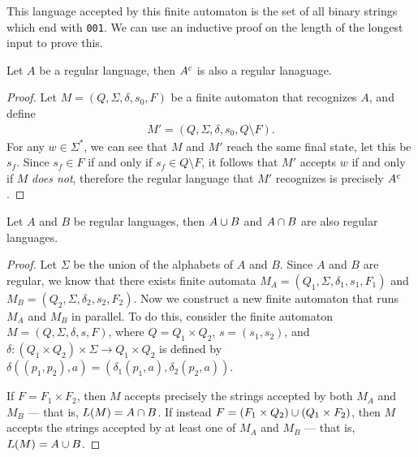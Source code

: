 \begin{exmp}
    This language accepted by this finite automaton is the set of all binary strings which end with \texttt{001}. We can use an inductive proof on the length of the longest input to prove this.
\end{exmp}

\begin{prop}\label{regular-language-complement}
    Let $A$ be a regular language, then $A^{c}$ is also a regular lanaguage.
\end{prop}

\begin{proof}
    Let $M = (Q, \Sigma, \delta, s_0, F)$ be a finite automaton that recognizes $A$, and define
    \begin{align*}
        M' = (Q, \Sigma, \delta, s_0, Q \setminus F).
    \end{align*}
    For any $w \in \Sigma^{*}$, we can see that $M$ and $M'$ reach the same final state, let this be $s_f$. Since $s_f \in F$ if and only if $s_f \in Q \setminus F$, it follows that $M'$ accepts $w$ if and only if $M$ \emph{does not}, therefore the regular language that $M'$ recognizes is precisely $A^{c}$.
\end{proof}

\begin{thm}\label{regular-language-union-intersection}
    Let $A$ and $B$ be regular languages, then $A \cup B$ and $A \cap B$ are also regular languages.
\end{thm}

\begin{proof}
    Let $\Sigma$ be the union of the alphabets of $A$ and $B$. Since $A$ and $B$ are regular, we know that there exists finite automata $M_A = \left(Q_1, \Sigma, \delta_1, s_1, F_1\right)$ and $M_B = \left(Q_2, \Sigma, \delta_2, s_2, F_2\right)$. Now we construct a new finite automaton that runs $M_A$ and $M_B$ in parallel. To do this, consider the finite automaton $M = \left(Q, \Sigma, \delta, s, F\right)$, where $Q = Q_1 \times Q_2$, $s = (s_1, s_2)$, and  $\delta: (Q_1 \times Q_2) \times \Sigma \to Q_1 \times Q_2$ is defined by $\delta\left((p_1, p_2), a\right) = \left(\delta_1\left(p_1, a\right), \delta_2\left(p_2, a\right)\right)$.
    
    If $F = F_1 \times F_2$, then $M$ accepts precisely the strings accepted by both $M_A$ and $M_B$ --- that is, $L(M) = A \cap B$. If instead $F = \left(F_1 \times Q_2\right) \cup \left(Q_1 \times F_2\right)$, then $M$ accepts the strings accepted by at least one of $M_A$ and $M_B$ --- that is, $L(M) = A \cup B$.
\end{proof}

